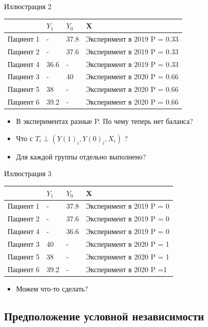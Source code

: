 \begin{frame}{Иллюстрация 2}
\begin{table}[]
\begin{tabular}{l|l|l||l}
&$Y_1$ & $Y_0$ & X \\
\hline
Пациент 1 & - & 37.8 & Эксперимент в 2019 P = 0.33 \\
Пациент 2 & - & 37.6 & Эксперимент в 2019 P = 0.33 \\
Пациент 4 & 36.6 & - & Эксперимент в 2019 P = 0.33  \\
Пациент 3 & - & 40 & Эксперимент в 2020 P = 0.66 \\
Пациент 5 &38   & - &  Эксперимент в 2020 P = 0.66 \\
Пациент 6 &39.2 & - & Эксперимент в 2020 P = 0.66
\end{tabular}
\begin{itemize}
        \item В экспериментах разные P. По чему теперь нет баланса?
        \item Что с $T_i \perp (Y(1)_i, Y(0)_i, X_i)$ ?
        \item Для каждой группы отдельно выполнено?
\end{itemize}
\end{table}
\end{frame}

\begin{frame}{Иллюстрация 3}
\begin{table}[]
\begin{tabular}{l|l|l||l}
&$Y_1$ & $Y_0$ & X \\
\hline
Пациент 1 & - & 37.8 & Эксперимент в 2019 P = 0 \\
Пациент 2 & - & 37.6 & Эксперимент в 2019 P = 0 \\
Пациент 4 & - & 36.6 & Эксперимент в 2019 P = 0  \\
Пациент 3 & 40 & - & Эксперимент в 2020 P = 1 \\
Пациент 5 &38   & - &  Эксперимент в 2020 P = 1 \\
Пациент 6 &39.2 & - & Эксперимент в 2020 P =1
\end{tabular}
\begin{itemize}
        \item Можем что-то сделать?
\end{itemize}
\end{table}

\end{frame} 

\subsection{Предположение условной независимости}

